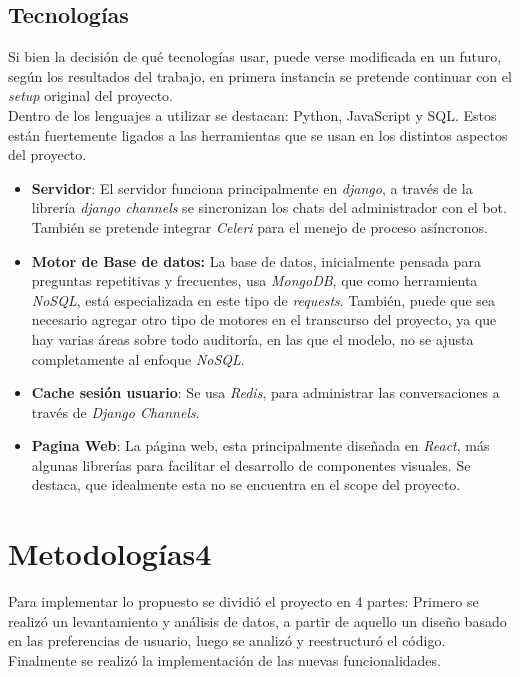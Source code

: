     \subsection{Tecnologías}
        Si bien la decisión de qué tecnologías usar, puede verse modificada en un futuro, según los resultados del trabajo, en primera instancia se pretende continuar con el \textit{setup} original del proyecto.\\
        Dentro de los lenguajes a utilizar se destacan: Python, JavaScript y SQL. Estos están fuertemente ligados a las herramientas que se usan en los distintos aspectos del proyecto.
        \begin{itemize}
            \item \textbf{Servidor}: El servidor funciona principalmente en \textit{django}, a través de la librería \textit{django channels} se sincronizan los chats del administrador con el bot. También se pretende integrar \textit{Celeri} para el menejo de proceso asíncronos.
            \item \textbf{Motor de Base de datos:} La base de datos, inicialmente pensada para preguntas repetitivas y frecuentes, usa \textit{MongoDB}, que como herramienta \textit{NoSQL}, está especializada en este tipo de \textit{requests}. También, puede que sea necesario agregar otro tipo de motores en el transcurso del proyecto, ya que hay varias áreas sobre todo auditoría, en las que el modelo, no se ajusta completamente al enfoque \textit{NoSQL}.
            \item \textbf{Cache sesión usuario}: Se usa \textit{Redis}, para administrar las conversaciones a través de \textit{Django Channels}.
            \item \textbf{Pagina Web}: La página web, esta principalmente diseñada en \textit{React}, más algunas librerías para facilitar el desarrollo de componentes visuales. Se destaca, que idealmente esta no se encuentra en el scope del proyecto.
        \end{itemize}

\section{Metodologías4}\label{sec:intro-met}
    \par Para implementar lo propuesto se dividió el proyecto en 4 partes: Primero se realizó un levantamiento y análisis de datos, a partir de aquello un diseño basado en las preferencias de usuario, luego se analizó y reestructuró el código. Finalmente se realizó la implementación de las nuevas funcionalidades.

